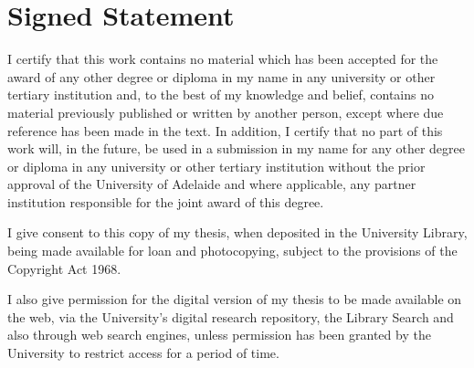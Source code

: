 \chapter{Signed Statement}
 {%




  I certify that this work contains no material which has been accepted for the award of any other degree or diploma in my name in any university or other tertiary institution and, to the best of my knowledge and belief, contains no material previously published or written by another person, except where due reference has been made in the text. In addition, I certify that no part of this work will, in the future, be used in a submission in my name for any other degree or diploma in any university or other tertiary institution without the prior approval of the University of Adelaide and where applicable, any partner institution responsible for the joint award of this degree.

  I give consent to this copy of my thesis, when deposited in the University Library, being made available for loan and photocopying, subject to the provisions of the Copyright Act 1968.

  I also give permission for the digital version of my thesis to be made available on the web, via the University's digital research repository, the Library Search and also through web search engines, unless permission has been granted by the University to restrict access for a period of time.


}
